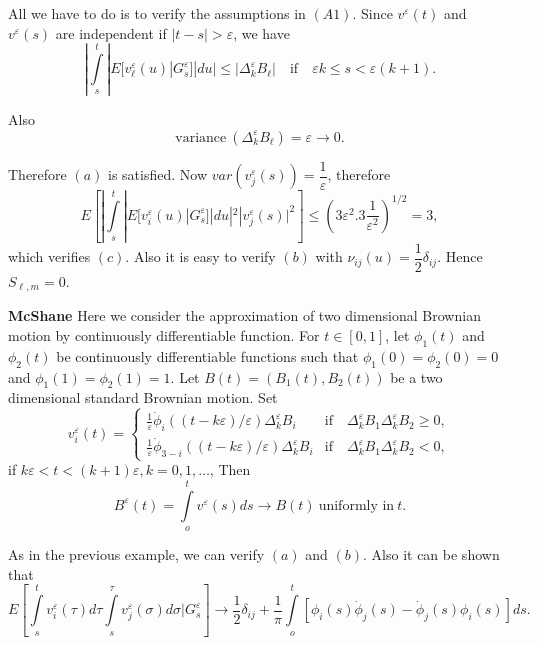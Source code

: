 All we have to do is to verify the assumptions in  $(A1)$. Since
$v^\varepsilon (t)$ and $v^\varepsilon (s)$ are independent if $|t-s|>
\varepsilon$, we have  
$$
| \int\limits_{s}^t |E [v^\varepsilon_\ell(u) |G^\varepsilon_s]| du|
\le | \Delta^\varepsilon_k B_\ell| \quad \text{if} \quad \varepsilon k \le s <
\varepsilon (k+1). 
$$

Also\pageoriginale 
$$
\text{variance}~ (\Delta^\varepsilon_k B_\ell) =\varepsilon \to 0.
$$

Therefore  $(a)$ is satisfied. Now $var(v^\varepsilon_j (s)) =
\dfrac{1}{\varepsilon}$, therefore 
$$
E \left[| \int\limits_s^t |E[v^\varepsilon_i (u) |G^\varepsilon_s]|du|^2
  |v^\varepsilon_j(s)|^2\right] \le \left(3 \varepsilon^2. 3
\frac{1}{\varepsilon^2}\right)^{1/2}=3, 
$$
which verifies $(c)$. Also it is easy to verify $(b)$ with
$\nu_{ij}(u) =\dfrac{1}{2} \delta_{ij}$. Hence $S_{\ell,m}=0$. 


\begin{example}\label{c3:exam3.2.4}%
  \textbf{McShane} Here we consider the approximation of two
  dimensional Brownian motion by continuously differentiable
  function. For $t \in[0,1]$, let $\phi_1(t)$ and $\phi_2(t)$
  be continuously differentiable functions such that  $\phi_1(0)=
  \phi_2 (0) =0$ and $\phi_1(1)= \phi_2(1) =1$. Let $B(t)=(B_1 (t),
  B_2(t))$ be a two dimensional standard Brownian motion. Set  
  \begin{equation*} 
    v_i^\varepsilon (t) =
    \begin{cases}
      \frac{1}{\varepsilon} \dot{\phi}_i ((t-k \varepsilon)/
      \varepsilon )\Delta^\varepsilon_k B_i &\text{if} \quad 
      \Delta^\varepsilon_k B_1 \Delta^\varepsilon_k  B_2 \ge 0,\\ 
      \frac{1}{\varepsilon} \dot{\phi}_{3-i} ((t-k \varepsilon)/
      \varepsilon )\Delta^\varepsilon_k B_i &\text{if} \quad \Delta^\varepsilon_k
      B_1 \Delta^\varepsilon_k  B_2 < 0, 
    \end{cases}
  \end{equation*}
  if $k \varepsilon < t < (k+1) \varepsilon, k=0,1, \ldots $, Then
  $$
  B^\varepsilon(t) = \int\limits_{o}^t v^\varepsilon (s) ds \to B(t)
  ~\text{uniformly in}~ t. 
  $$
\end{example}

As in the previous example, we can verify $(a)$ and $(b)$. Also it can
be shown that  
$$
E \left[ \int\limits_{s}^t v^\varepsilon_i (\tau) d \tau 
  \int\limits_{s}^\tau v ^\varepsilon_j(\sigma) d
  \sigma| G^\varepsilon_s\right] \to \frac{1}{2} \delta_{ij} + \frac{1}{\pi}
\int\limits_{o}^t [\phi_i (s) \dot{\phi}_j (s)- \dot{\phi}_j(s) \phi_i
  (s)]ds. 
$$

